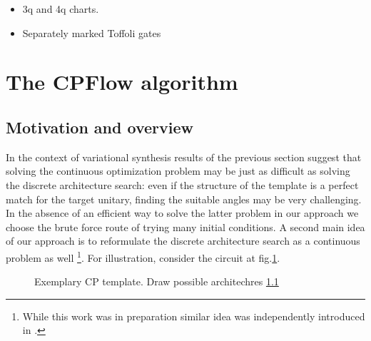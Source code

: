 \documentclass[amsfonts, amssymb, aps, nofootinbib]{revtex4-2}
\begin{document}
\begin{itemize}
	\item 3q and 4q charts.
	\item Separately marked Toffoli gates
\end{itemize}
\section{The CPFlow algorithm}
\subsection{Motivation and overview}
In the context of variational synthesis results of the previous section suggest that solving the continuous optimization problem may be just as difficult as solving the discrete architecture search: even if the structure of the template is a perfect match for the target unitary, finding the suitable angles may be very challenging. In the absence of an efficient way to solve the latter problem in our approach we choose the brute force route of trying many initial conditions. A second main idea of our approach is to reformulate the discrete architecture search as a continuous problem as well \footnote{While this work was in preparation similar idea was independently introduced in \cite{Rakyta2022}.}. For illustration, consider the circuit at fig.\ref{fig cp example}.
\begin{figure}[h!]
\caption{Exemplary CP template. Draw possible architechres \ref{}}
\label{fig cp example}
\end{figure}
\end{document}
